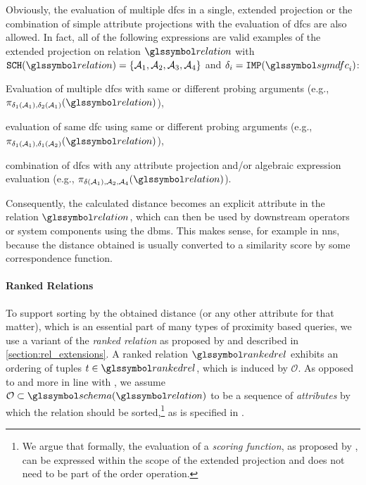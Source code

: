 Obviously, the evaluation of multiple \acrshort{dfc}s in a single, extended projection or the combination of simple attribute projections with the evaluation of \acrshort{dfc}s are also allowed. In fact, all of the following expressions are valid examples of the extended projection on relation $\relation$ with $\mathtt{SCH}(\relation) = \{ \mathcal{A}_1, \mathcal{A}_2, \mathcal{A}_3, \mathcal{A}_4 \}$ and $\delta_i = \mathtt{IMP}(\symdfc_i)$: 
\begin{enumerate*}[label=(\roman*)]
    \item Evaluation of multiple \acrshort{dfc}s with same or different probing arguments (e.g., $\pi_{\delta_1(\mathcal{A}_1), \delta_2(\mathcal{A}_1)}(\relation)$), 
    \item evaluation of same \acrshort{dfc} using same or different probing arguments (e.g., $\pi_{\delta_1(\mathcal{A}_1), \delta_1(\mathcal{A}_2)}(\relation)$),
    \item combination of \acrshort{dfc}s with any attribute projection and/or algebraic expression evaluation (e.g., $\pi_{\delta(\mathcal{A}_1), \mathcal{A}_2, \mathcal{A}_4}(\relation)$).
\end{enumerate*}

Consequently, the calculated distance becomes an explicit attribute in the relation $\relation$, which can then be used by downstream operators or system components using the \acrshort{dbms}. This makes sense, for example in \acrshort{nns}, because the distance obtained is usually converted to a similarity score by some correspondence function.

\paragraph{Ranked Relations}

To support sorting by the obtained distance (or any other attribute for that matter), which is an essential part of many types of proximity based queries, we use a variant of the \emph{ranked relation} as proposed by \cite{Chengkai:2005RankSQL} and described in \cref{section:rel_extensions}. A ranked relation $\rankedrel$ exhibits an ordering of tuples $t \in \rankedrel$, which is induced by $\mathcal{O}$. As opposed to \cite{Chengkai:2005RankSQL} and more in line with \cite{Garcia:2009Database}, we assume $\mathcal{O} \subset \schema (\relation)$ to be a sequence of \emph{attributes} by which the relation should be sorted,\footnote{We argue that formally, the evaluation of a \emph{scoring function}, as proposed by \cite{Chengkai:2005RankSQL}, can be expressed within the scope of the extended projection and does not need to be part of the order operation.} as is specified in .

